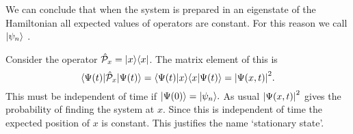     We can conclude that when the system is prepared in an eigenstate of the Hamiltonian all expected values of operators are constant.
    For this reason we call \(\vert {\psi_n} \rangle\) .
    
    \begin{example}
        Consider the operator \(\hat{\mathcal{P}}_x = \vert {x}\rangle\langle {x} \vert\).
        The matrix element of this is
        \[\langle {\Psi(t)} \vert\hat{\mathcal{P}}_x\vert {\Psi(t)} \rangle = \langle {\Psi(t)} \vert {x} \rangle\langle {x} \vert {\Psi(t)} \rangle = \abs{\Psi(x, t)}^2.\]
        This must be independent of time if \(\vert {\Psi(0)} \rangle = \vert {\psi_n} \rangle.\)
        As usual \(\abs{\Psi(x, t)}^2\) gives the probability of finding the system at \(x\).
        Since this is independent of time the expected position of \(x\) is constant.
        This justifies the name `stationary state'.
    \end{example}
    
